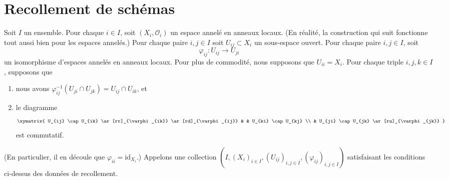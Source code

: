 \section{Recollement de schémas}
\label{section-glueing-schemes}

\noindent
Soit $I$ un ensemble.
Pour chaque $i \in I$, soit $(X_i, \mathcal{O}_i)$ un
espace annelé en anneaux locaux. (En réalité, la construction qui
suit fonctionne tout aussi bien pour les espaces annelés.)
Pour chaque paire $i, j \in I$ soit $U_{ij} \subset X_i$
un sous-espace ouvert.
Pour chaque paire $i, j \in I$, soit
$$
\varphi_{ij} : U_{ij} \to U_{ji}
$$
un isomorphisme d'espaces annelés en anneaux locaux.
Pour plus de commodité, nous supposons que $U_{ii} = X_i$.
Pour chaque triple $i, j, k \in I$, supposons que
\begin{enumerate}
\item nous avons
$\varphi_{ij}^{-1}(U_{ji} \cap U_{jk}) = U_{ij} \cap U_{ik}$, et
\item le diagramme
$$
\xymatrix{
U_{ij} \cap U_{ik} \ar[rr]_{\varphi_{ik}} \ar[rd]_{\varphi_{ij}} & &
U_{ki} \cap U_{kj} \\
& U_{ji} \cap U_{jk} \ar[ru]_{\varphi_{jk}}
}
$$
est commutatif.
\end{enumerate}
(En particulier, il en découle que $\varphi_{ii} = \text{id}_{X_i}$.)
Appelons une collection $(I,
(X_i)_{i\in I}, (U_{ij})_{i, j\in I}, (\varphi_{ij})_{i, j\in I})$ satisfaisant
les conditions ci-dessus des données de recollement.

